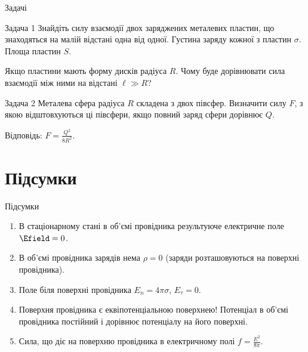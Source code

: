 \documentclass{beamer}
\begin{document}
\begin{frame}{Задачі}{}
	\begin{exampleblock}{Задача 1}\justifying\small
		Знайдіть силу взаємодії двох заряджених металевих пластин, що знаходяться на малій відстані
		одна від одної. Густина заряду кожної з пластин $\sigma$. Площа пластин $S$.

		\medskip

		Якщо пластини мають форму дисків радіуса $R$. Чому буде дорівнювати сила взаємодії між ними на
		відстані $\ell \gg R$?
	\end{exampleblock}


	\begin{exampleblock}{Задача 2}\justifying\small
		Металева сфера радіуса $R$ складена з двох півсфер. Визначити силу $F$, з якою відштовхуються
		ці півсфери, якщо повний заряд сфери дорівнює $Q$.

		\bigskip

		Відповідь: $F= \frac{Q^2}{8R^2}$.
	\end{exampleblock}
\end{frame}




\section*{{Підсумки}}



\begin{frame}{Підсумки}{}
\begin{enumerate}
\item В стаціонарному стані в об'ємі провідника результуюче електричне поле $\Efield = 0$.
\item В об'ємі провідника зарядів нема $\rho = 0$ (заряди розташовуються на поверхні провідника).
\item Поле біля поверхні провідника $E_n = 4\pi\sigma$, $E_{\tau} = 0$.
\item Поверхня провідника є еквіпотенціальною поверхнею! Потенціал в об'ємі провідника
постійний і дорівнює потенціалу на його поверхні.
\item Сила, що діє на поверхню провідника в електричному полі $f = \frac{E^2}{8\pi}$.
\end{enumerate}
\end{frame}
\end{document}
